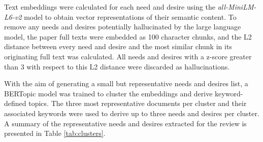 \documentclass[conference]{IEEEtran}
\begin{document}

Text embeddings were calculated for each need and desire using the \textit{all-MiniLM-L6-v2} model \cite{all-minilm-l6-v2} to obtain vector representations of their semantic content.
To remove any needs and desires potentially hallucinated by the large language model, the paper full texts were embedded as 100 character chunks, and the L2 distance between every need and desire and the most similar chunk in its originating full text was calculated.
All needs and desires with a z-score greater than 3 with respect to this L2 distance were discarded as hallucinations.

With the aim of generating a small but representative needs and desires list, a BERTopic model \cite{bertopic} was trained to cluster the embeddings and derive keyword-defined topics.
The three most representative documents per cluster and their
associated keywords were used to derive up to three needs and desires per cluster. A summary of the representative needs and desires extracted for the review is presented in Table \ref{tab:clusters}. 
\end{document}
